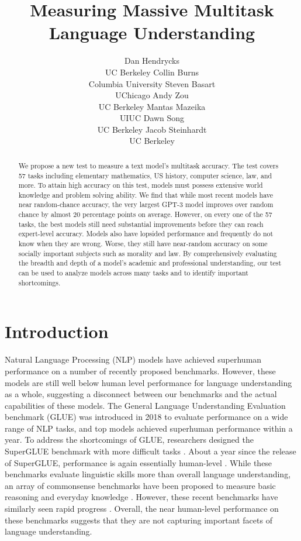 \documentclass{article}
\title{Measuring Massive Multitask\\Language Understanding}
\author{
Dan Hendrycks\\UC Berkeley \And Collin Burns\\Columbia University \And Steven Basart\\UChicago \And Andy Zou\\UC Berkeley \AND Mantas Mazeika\\UIUC \And Dawn Song\\UC Berkeley \And Jacob Steinhardt\\UC Berkeley\AND
}
\begin{document}
\maketitle

\vspace{-35pt}
\begin{abstract}
We propose a new test to measure a text model's multitask accuracy. The test covers 57 tasks including elementary mathematics, US history, computer science, law, and more. To attain high accuracy on this test, models must possess extensive world knowledge and problem solving ability. We find that while most recent models have near random-chance accuracy, the very largest GPT-3 model improves over random chance by almost 20 percentage points on average. However, on every one of the 57 tasks, the best models still need substantial improvements before they can reach expert-level accuracy. Models also have lopsided performance and frequently do not know when they are wrong. Worse, they still have near-random accuracy on some socially important subjects such as morality and law. By comprehensively evaluating the breadth and depth of a model's academic and professional understanding, our test can be used to analyze models across many tasks and to identify important shortcomings.
\end{abstract}

\section{Introduction}

Natural Language Processing (NLP) models have achieved superhuman performance on a number of recently proposed benchmarks. 
However, these models are still well below human level performance for language understanding as a whole, suggesting a disconnect between our benchmarks and the actual capabilities of these models. 
The General Language Understanding Evaluation benchmark (GLUE) \citep{wang2018glue} was introduced in 2018 to evaluate performance on a wide range of NLP tasks, and top models achieved superhuman performance within a year. To address the shortcomings of GLUE, researchers designed the SuperGLUE benchmark with more difficult tasks \citep{wang2019superglue}. About a year since the release of SuperGLUE, performance is again essentially human-level \citep{raffel2019exploringT5}. While these benchmarks evaluate linguistic skills more than overall language understanding, an array of commonsense benchmarks have been proposed to measure basic reasoning and everyday knowledge \citep{zellers2019hellaswag,huang2019cosmosqa,bisk2019physicaliqa}. 
However, these recent benchmarks have similarly seen rapid progress \citep{khashabi2020unifiedqa}. Overall, the near human-level performance on these benchmarks suggests that they are not capturing important facets of language understanding.
\end{document}
